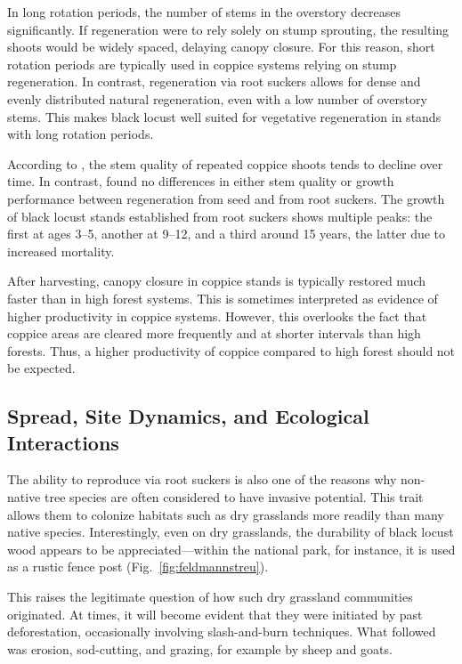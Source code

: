In long rotation periods, the number of stems in the overstory decreases significantly. If regeneration were to rely solely on stump sprouting, the resulting shoots would be widely spaced, delaying canopy closure. For this reason, short rotation periods are typically used in coppice systems relying on stump regeneration. In contrast, regeneration via root suckers allows for dense and evenly distributed natural regeneration, even with a low number of overstory stems. This makes black locust well suited for vegetative regeneration in stands with long rotation periods.

According to \citet{iski2019robinie}, the stem quality of repeated coppice shoots tends to decline over time. In contrast, \citet{redei2011robinieWaldbau} found no differences in either stem quality or growth performance between regeneration from seed and from root suckers. The growth of black locust stands established from root suckers shows multiple peaks: the first at ages 3–5, another at 9–12, and a third around 15 years, the latter due to increased mortality.

After harvesting, canopy closure in coppice stands is typically restored much faster than in high forest systems. This is sometimes interpreted as evidence of higher productivity in coppice systems. However, this overlooks the fact that coppice areas are cleared more frequently and at shorter intervals than high forests. Thus, a higher productivity of coppice compared to high forest should not be expected.

\subsection{Spread, Site Dynamics, and Ecological Interactions}

The ability to reproduce via root suckers is also one of the reasons why non-native tree species are often considered to have invasive potential. This trait allows them to colonize habitats such as dry grasslands more readily than many native species. Interestingly, even on dry grasslands, the durability of black locust wood appears to be appreciated—within the national park, for instance, it is used as a rustic fence post (Fig.~\ref{fig:feldmannstreu}).

This raises the legitimate question of how such dry grassland communities originated. At times, it will become evident that they were initiated by past deforestation, occasionally involving slash-and-burn techniques. What followed was erosion, sod-cutting, and grazing, for example by sheep and goats.

